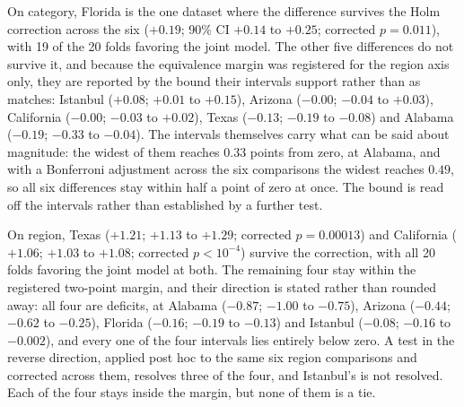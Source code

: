 On category, Florida is the one dataset where the difference survives the
Holm correction across the six ($+0.19$; 90\% CI $+0.14$ to $+0.25$; corrected $p=0.011$), with 19 of the
20 folds favoring the joint model. The other five differences do not survive it, and because the
equivalence margin was registered for the region axis only, they are reported by the bound their intervals support
rather than as matches: Istanbul ($+0.08$; $+0.01$ to $+0.15$), Arizona ($-0.00$; $-0.04$ to
$+0.03$), California ($-0.00$; $-0.03$ to $+0.02$), Texas ($-0.13$; $-0.19$ to $-0.08$) and Alabama
($-0.19$; $-0.33$ to $-0.04$).
The intervals themselves carry what can be said about magnitude:
the widest of them reaches $0.33$ points from zero, at Alabama, and with a Bonferroni adjustment
across the six comparisons the widest reaches $0.49$, so all six differences stay within half a point
of zero at once.
The bound is read off the intervals rather than established by a
further test.

On region, Texas ($+1.21$; $+1.13$ to $+1.29$; corrected $p=0.00013$) and California ($+1.06$;
$+1.03$ to $+1.08$; corrected $p<10^{-4}$) survive the correction, with all 20 folds favoring the
joint model at both. The remaining four stay within the registered two-point margin, and their
direction is stated rather than rounded away: all four are deficits, at Alabama ($-0.87$; $-1.00$
to $-0.75$), Arizona ($-0.44$; $-0.62$ to $-0.25$), Florida ($-0.16$; $-0.19$ to $-0.13$) and
Istanbul ($-0.08$; $-0.16$ to $-0.002$), and every one of the four intervals lies entirely below
zero. A test in the reverse direction, applied post hoc to the same six region comparisons and
corrected across them, resolves three of the four, and Istanbul's is not resolved. Each of the four
stays inside the margin, but none of them is a tie.

